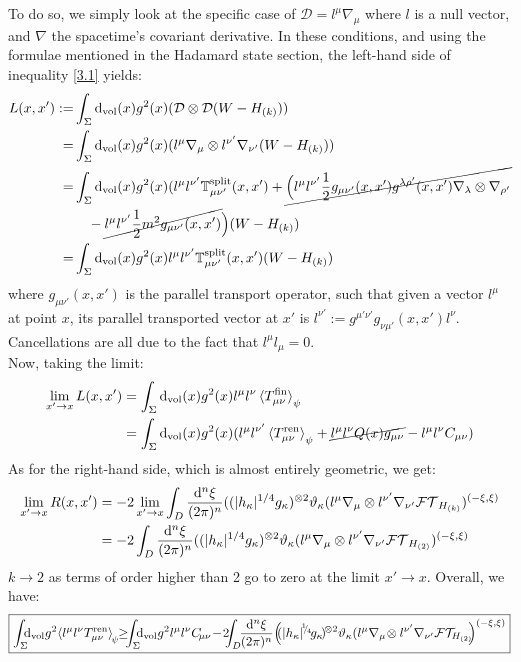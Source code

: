 \documentclass[a4paper,11pt]{article}
\numberwithin{equation}{section}
\theoremstyle{definition}
\renewcommand{\d}{{\mathrm{d}}}
\begin{document}
To do so, we simply look at the specific case of $\mathcal{D}=l^\mu\nabla_\mu$ where $l$ is a null vector, and $\nabla$ the spacetime's covariant derivative. In these conditions, and using the formulae mentioned in the Hadamard state section, the left-hand side of inequality \ref{3.1} yields:
\begin{align}
    L(x,x'):=& \int_\Sigma \d_\mathrm{vol}(x) g^2(x) (\mathcal{D}\otimes\mathcal{D}(W-H_{(k)}))\notag\\
    =& \int_\Sigma \d_\mathrm{vol}(x) g^2(x) (l^\mu\nabla_\mu\otimes l^{\nu'}\nabla_{\nu'}(W-H_{(k)}))\notag\\
    =& \int_\Sigma \d_\mathrm{vol}(x) g^2(x) (l^\mu l^{\nu'}\mathbb{T}^\mathrm{split}_{\mu\nu'}(x,x')+\cancel{\Big(l^\mu l^{\nu'}\frac{1}{2}g_{\mu\nu'}(x,x')g^{\lambda\rho'}(x,x')\nabla_\lambda\otimes\nabla_{\rho'}}\notag\\
    &\quad - \cancel{l^\mu l^{\nu'}\frac{1}{2}m^2g_{\mu\nu'}(x,x')}\Big)(W-H_{(k)})\notag\\
    =& \int_\Sigma \d_\mathrm{vol}(x) g^2(x) l^\mu l^{\nu'}\mathbb{T}^\mathrm{split}_{\mu\nu'}(x,x')(W-H_{(k)})
\end{align}
where $g_{\mu\nu'}(x,x')$ is the parallel transport operator, such that given a vector $l^\mu$ at point $x$, its parallel transported vector at $x'$ is $l^{\nu'}:=g^{\mu'\nu'}g_{\nu\mu'}(x,x') l^\nu $. Cancellations are all due to the fact that $l^\mu l_\mu=0$.
\\
Now, taking the limit:
\begin{align}
    \lim_{x'\to x}L(x,x') &= \int_\Sigma \d_\mathrm{vol}(x) g^2(x) l^\mu l^\nu\braket{T^\mathrm{fin}_{\mu\nu}}_\psi\notag\\
    &= \int_\Sigma \d_\mathrm{vol}(x) g^2(x) (l^\mu l^{\nu'}\braket{T^\mathrm{ren}_{\mu\nu}}_\psi+\cancel{l^\mu l^\nu Q(x)g_{\mu\nu}}-l^\mu l^\nu C_{\mu\nu})
\end{align}
As for the right-hand side, which is almost entirely geometric, we get:
\begin{align}
    \lim_{x'\to x} R(x,x') &= -2\lim_{x'\to x}\int_D\frac{\d^n\xi}{(2\pi)^n}((|h_\kappa|^{1/4}g_\kappa)^{\otimes 2}\vartheta_\kappa(l^\mu\nabla_\mu\otimes l^{\nu'}\nabla_{\nu'}\mathcal{FT}_{H_{(k)}})^{(-\xi,\xi)}\notag\\
    &=-2\int_D\frac{\d^n\xi}{(2\pi)^n}((|h_\kappa|^{1/4}g_\kappa)^{\otimes 2}\vartheta_\kappa(l^\mu\nabla_\mu\otimes l^{\nu'}\nabla_{\nu'}\mathcal{FT}_{H_{(2)}})^{(-\xi,\xi)}
\end{align}
$k\to2$ as terms of order higher than 2 go to zero at the limit $x'\to x$. Overall, we have:
\begin{equation}\label{eq82}
    \boxed{\int_\Sigma \!\!\!\d_\mathrm{vol} g^2 \!\braket{l^\mu l^\nu T^\mathrm{ren}_{\mu\nu}}_{\!\psi} \!\!\geq\!\!\! \int_\Sigma \!\!\!\d_\mathrm{vol} g^2l^\mu l^\nu C_{\!\mu\nu}\!-\!2\!\!\!\int_D\!\!\frac{\d^n\xi}{(2\pi)^n}\!\left(\!\!(|h_\kappa|^{\!^1\!\!/_{\!4}}\!g_\kappa\!)^{\!\otimes 2}\vartheta_\kappa(l^\mu\nabla_\mu\!\otimes l^{\nu'}\nabla_{\nu'}\mathcal{FT}_{\!\!H_{(2)}}\!\!\right)^{(-\xi,\xi)}}
\end{equation}
\end{document}

